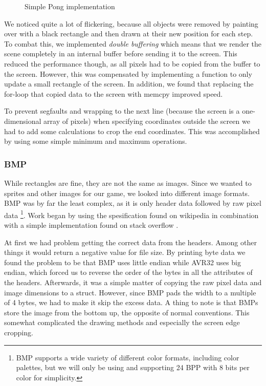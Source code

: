 \documentclass[a4paper,12pt]{article}
\begin{document}
\begin{figure}
\centering
{}
\caption{Simple Pong implementation }
\label{fig:pong}
\end{figure}

We noticed quite a lot of flickering, because all objects were removed by painting over with a black rectangle and then drawn at their new position for each step. To combat this, we implemented \emph{double buffering} which means that we render the scene completely in an internal buffer before sending it to the screen. This reduced the performance though, as all pixels had to be copied from the buffer to the screen. However, this was compensated by implementing a function to only update a small rectangle of the screen. In addition, we found that replacing the for-loop that copied data to the screen with memcpy improved speed.

To prevent segfaults and wrapping to the next line (because the screen is a one-dimensional array of pixels) when specifying coordinates outside the screen we had to add some calculations to crop the end coordinates. This was accomplished by using some simple minimum and maximum operations.

\subsubsection{BMP} %

While rectangles are fine, they are not the same as images. Since we wanted to sprites and other images for our game, we looked into different image formats. BMP was by far the least complex, as it is only header data followed by raw pixel data \footnote{BMP supports a wide variety of different color formats, including color palettes, but we will only be using and supporting 24 BPP with 8 bits per color for simplicity.}. Work began by using the spesification found on wikipedia \cite{BMP_file_format} in combination with a simple implementation found on stack overflow \cite{stackoverflow_bmp}.

At first we had problem getting the correct data from the headers. Among other things it would return a negative value for file size. By printing byte data we found the problem to be that BMP uses little endian while AVR32 uses big endian, which forced us to reverse the order of the bytes in all the attributes of the headers. Afterwards, it was a simple matter of copying the raw pixel data and image dimensions to a struct. However, since BMP pads the width to a multiple of 4 bytes, we had to make it skip the excess data. A thing to note is that BMPs store the image from the bottom up, the opposite of normal conventions. This somewhat complicated the drawing methods and especially the screen edge cropping.
\end{document}
